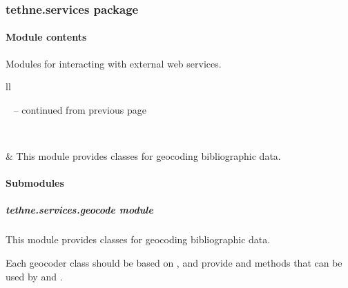 \documentclass[letterpaper,10pt,english]{sphinxmanual}
\begin{document}
\subsubsection{tethne.services package}
\label{tethne.services::doc}\label{tethne.services:tethne-services-package}

\paragraph{Module contents}
\label{tethne.services:module-contents}\label{tethne.services:module-tethne.services}
Modules for interacting with external web services.

\begin{longtable}{ll}
\hline
\endfirsthead

%
{{\textsf{\tablename\ \thetable{} -- continued from previous page}}} \\
\hline
\endhead

\hline {} \\ \hline
\endfoot

\endlastfoot


{\hyperref[tethne.services.geocode:module-tethne.services.geocode]{}}
 & 
This module provides classes for geocoding bibliographic data.
\\
\hline\end{longtable}



\paragraph{Submodules}
\label{tethne.services:submodules}

\subparagraph{tethne.services.geocode module}
\label{tethne.services.geocode:module-tethne.services.geocode}\label{tethne.services.geocode::doc}\label{tethne.services.geocode:tethne-services-geocode-module}
This module provides classes for geocoding bibliographic data.

Each geocoder class should be based on {\hyperref[tethne.services.geocode:tethne.services.geocode.BaseCoder]{}}, and provide
 and  methods that can be used by 
{\hyperref[tethne.services.geocode:tethne.services.geocode.BaseCoder.code_this]{}} and {\hyperref[tethne.services.geocode:tethne.services.geocode.BaseCoder.code_list]{}}.
\end{document}
